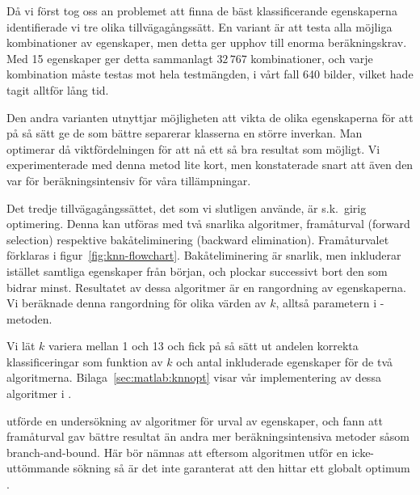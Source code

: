 \documentclass[../rapport_MVEX01-11-05]{subfiles}
\begin{document}
Då vi först tog oss an problemet att finna de bäst klassificerande
egenskaperna identifierade vi tre olika tillvägagångssätt. En variant är att
testa alla möjliga kombinationer av egenskaper,
men detta ger upphov till enorma beräkningskrav. Med 15
egenskaper ger detta sammanlagt $32\,767$ kombinationer, och varje kombination
måste testas mot hela testmängden, i vårt fall 640 bilder, vilket hade tagit
alltför lång tid.
 
Den andra varianten utnyttjar
möjligheten att vikta de olika egenskaperna för att på så sätt ge de som bättre
separerar klasserna en
större inverkan. Man optimerar då
viktfördelningen för att nå ett så bra resultat som möjligt. Vi experimenterade
med denna metod lite kort, men konstaterade snart att även den var för 
beräkningsintensiv för våra tillämpningar.

Det tredje tillvägagångssättet, det som vi slutligen 
använde, är s.k.~girig optimering. Denna kan utföras med två snarlika
algoritmer, framåturval (forward selection) respektive
bakåteliminering (backward elimination).
Framåturvalet förklaras 
i figur~\vref{fig:knn-flowchart}. Bakåteliminering är snarlik, men inkluderar
istället samtliga egenskaper från början, och plockar successivt bort den 
som bidrar minst.
Resultatet av dessa algoritmer är en rangordning av egenskaperna.
Vi beräknade denna rangordning för olika värden
av $k$, alltså parametern i \knn-metoden.

Vi lät $k$ variera mellan 1 och 13 och fick på så sätt ut andelen
korrekta klassificeringar som funktion av $k$ och antal inkluderade egenskaper
för de två algoritmerna. Bilaga~\ref{sec:matlab:knnopt} visar vår
implementering av dessa algoritmer i \MATLAB.

 utförde en undersökning av algoritmer för urval av egenskaper,
och fann att framåturval gav bättre resultat än andra mer beräkningsintensiva
metoder såsom branch-and-bound.
Här bör nämnas att eftersom algoritmen utför en icke-uttömmande sökning så är
det inte garanterat att den hittar ett globalt optimum \cite{Cover77}.
\end{document}

